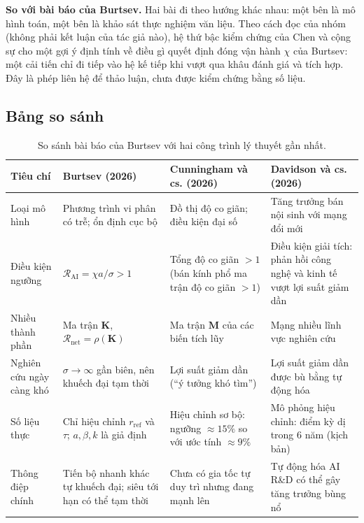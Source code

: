 \documentclass[12pt,a4paper,openany]{report}
\numberwithin{equation}{chapter}   %
\theoremstyle{definition}
\newcommand{\RAI}{\mathcal{R}_{\mathrm{AI}}}
\newcommand{\Rnet}{\mathcal{R}_{\mathrm{net}}}
\begin{document}
\textbf{So với bài báo của Burtsev.} Hai bài đi theo hướng khác nhau: một bên là mô hình toán, một bên là khảo sát thực nghiệm văn liệu. Theo cách đọc của nhóm (không phải kết luận của tác giả nào), hệ thứ bậc kiểm chứng của Chen và cộng sự cho một gợi ý định tính về điều gì quyết định đóng vận hành $\chi$ của Burtsev: một cải tiến chỉ đi tiếp vào hệ kế tiếp khi vượt qua khâu đánh giá và tích hợp. Đây là phép liên hệ để thảo luận, chưa được kiểm chứng bằng số liệu.

\subsection{Bảng so sánh}
\begin{table}[ht]
\centering
\small
\caption{So sánh bài báo của Burtsev với hai công trình lý thuyết gần nhất.}\label{tab:sosanh}
\begin{tabular}{@{}>{\raggedright\arraybackslash}p{2.4cm}>{\raggedright\arraybackslash}p{4.0cm}>{\raggedright\arraybackslash}p{4.0cm}>{\raggedright\arraybackslash}p{4.0cm}@{}}
\toprule
\textbf{Tiêu chí} & \textbf{Burtsev (2026)} & \textbf{Cunningham và cs. (2026)} & \textbf{Davidson và cs. (2026)}\\
\midrule
Loại mô hình & Phương trình vi phân có trễ; ổn định cục bộ & Đồ thị độ co giãn; điều kiện đại số & Tăng trưởng bán nội sinh với mạng đổi mới\\
Điều kiện ngưỡng & $\RAI=\chi a/\sigma>1$ & Tổng độ co giãn $>1$ (bán kính phổ ma trận độ co giãn $>1$) & Điều kiện giải tích: phản hồi công nghệ và kinh tế vượt lợi suất giảm dần\\
Nhiều thành phần & Ma trận $\mathbf{K}$, $\Rnet=\rho(\mathbf{K})$ & Ma trận $\mathbf{M}$ của các biến tích lũy & Mạng nhiều lĩnh vực nghiên cứu\\
Nghiên cứu ngày càng khó & $\sigma\to\infty$ gần biên, nên khuếch đại tạm thời & Lợi suất giảm dần (``ý tưởng khó tìm'') & Lợi suất giảm dần được bù bằng tự động hóa\\
Số liệu thực & Chỉ hiệu chỉnh $r_{\mathrm{ref}}$ và $\tau$; $a,\beta,k$ là giả định & Hiệu chỉnh sơ bộ: ngưỡng $\approx15\%$ so với ước tính $\approx9\%$ & Mô phỏng hiệu chỉnh: điểm kỳ dị trong 6 năm (kịch bản)\\
Thông điệp chính & Tiến bộ nhanh khác tự khuếch đại; siêu tới hạn có thể tạm thời & Chưa có gia tốc tự duy trì nhưng đang mạnh lên & Tự động hóa AI R\&D có thể gây tăng trưởng bùng nổ\\
\bottomrule
\end{tabular}
\end{table}
\end{document}
